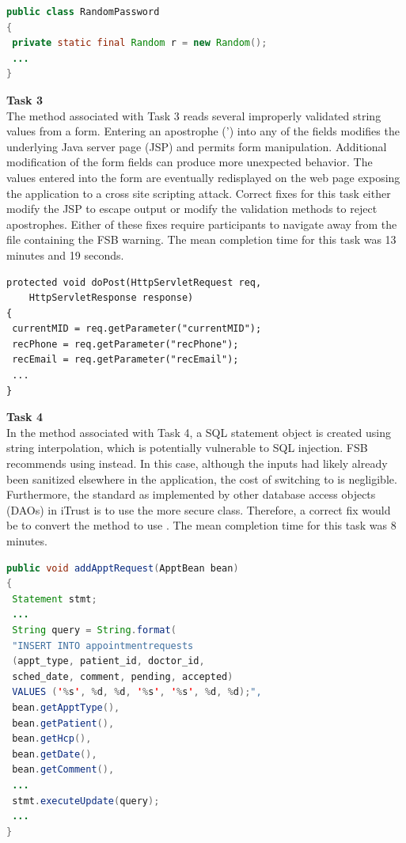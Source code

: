 \documentclass[10pt,journal,compsoc]{IEEEtran}
\begin{document}
\begin{lstlisting}[language=Java]
public class RandomPassword
{
 private static final Random r = new Random();
 ...
}	
\end{lstlisting}

\noindent\textbf{Task 3} \\
The method associated with Task 3 reads several improperly validated string values from a form. 
Entering an apostrophe (') into any of the fields modifies the underlying Java server page (JSP) and permits form manipulation.
Additional modification of the form fields can produce more unexpected behavior. 
The values entered into the form are eventually redisplayed on the web page exposing the application to a cross site scripting attack. 
Correct fixes for this task either modify the JSP to escape output or modify the validation methods to reject apostrophes. 
Either of these fixes require participants to navigate away from the file containing the FSB warning.
The mean completion time for this task was 13 minutes and 19 seconds.

\begin{lstlisting}
protected void doPost(HttpServletRequest req, 
	HttpServletResponse response)
{
 currentMID = req.getParameter("currentMID");
 recPhone = req.getParameter("recPhone");
 recEmail = req.getParameter("recEmail");
 ...
}
\end{lstlisting}

\noindent\textbf{Task 4} \\
In the method associated with Task 4, a SQL statement object is created using string interpolation, which is potentially vulnerable to SQL injection. 
FSB recommends using   instead. 
In this case, although the inputs had likely already been sanitized elsewhere in the application, the cost of switching to  is negligible.
Furthermore, the standard as implemented by other database access objects (DAOs) in iTrust is to use the more secure  class.
Therefore, a correct fix would be to convert the method to use .
The mean completion time for this task was 8 minutes.
\\

\begin{lstlisting}[language=Java]
public void addApptRequest(ApptBean bean)
{
 Statement stmt;
 ...
 String query = String.format(
 "INSERT INTO appointmentrequests 
 (appt_type, patient_id, doctor_id,
 sched_date, comment, pending, accepted) 
 VALUES ('%s', %d, %d, '%s', '%s', %d, %d);",
 bean.getApptType(),
 bean.getPatient(),
 bean.getHcp(),
 bean.getDate(),
 bean.getComment(),
 ...
 stmt.executeUpdate(query);
 ...
}
\end{lstlisting}
\end{document}
